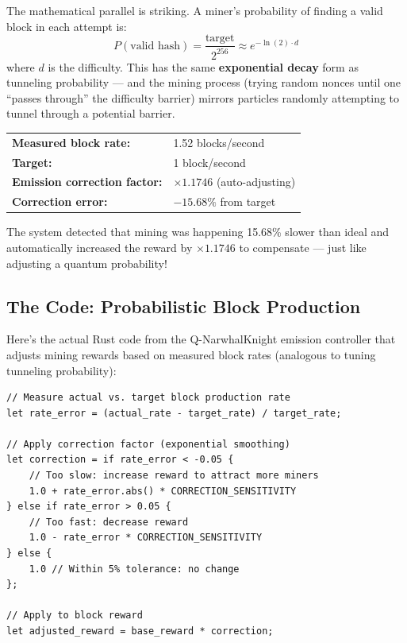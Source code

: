 \documentclass[11pt,a4paper]{article}
\begin{document}
The mathematical parallel is striking. A miner's probability of finding a valid block in each attempt is:
\begin{equation}
P(\text{valid hash}) = \frac{\text{target}}{2^{256}} \approx e^{-\ln(2) \cdot d}
\end{equation}
where $d$ is the difficulty. This has the same \textbf{exponential decay} form as tunneling probability --- and the mining process (trying random nonces until one ``passes through'' the difficulty barrier) mirrors particles randomly attempting to tunnel through a potential barrier.

\begin{tcolorbox}[colback=tealcolor!10,colframe=tealcolor,title=\textbf{Real Stat: Block Rate on Q-NarwhalKnight (April 2026)}]
\begin{center}
\begin{tabular}{ll}
\textbf{Measured block rate:} & 1.52 blocks/second \\
\textbf{Target:} & 1 block/second \\
\textbf{Emission correction factor:} & $\times 1.1746$ (auto-adjusting) \\
\textbf{Correction error:} & $-15.68\%$ from target \\
\end{tabular}
\end{center}
The system detected that mining was happening 15.68\% slower than ideal and automatically increased the reward by $\times 1.1746$ to compensate --- just like adjusting a quantum probability!
\end{tcolorbox}

\subsection{The Code: Probabilistic Block Production}

Here's the actual Rust code from the Q-NarwhalKnight emission controller that adjusts mining rewards based on measured block rates (analogous to tuning tunneling probability):

\begin{lstlisting}[caption={Emission correction in emission\_controller.rs --- dynamically adjusting reward like a quantum probability}]
// Measure actual vs. target block production rate
let rate_error = (actual_rate - target_rate) / target_rate;

// Apply correction factor (exponential smoothing)
let correction = if rate_error < -0.05 {
    // Too slow: increase reward to attract more miners
    1.0 + rate_error.abs() * CORRECTION_SENSITIVITY
} else if rate_error > 0.05 {
    // Too fast: decrease reward
    1.0 - rate_error * CORRECTION_SENSITIVITY
} else {
    1.0 // Within 5% tolerance: no change
};

// Apply to block reward
let adjusted_reward = base_reward * correction;
\end{lstlisting}
\end{document}
